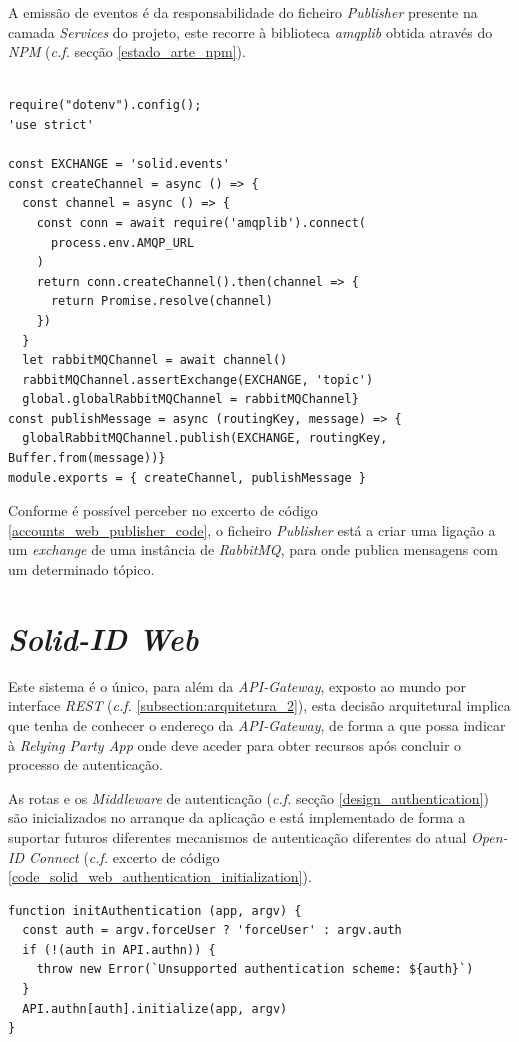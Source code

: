 A emissão de eventos é da responsabilidade do ficheiro \emph{Publisher} presente na camada \emph{Services} do projeto, este recorre à biblioteca \emph{amqplib} obtida através do \emph{NPM} (\emph{c.f.} secção \ref{estado_arte_npm}).

\begin{lstlisting}[caption={\emph{Publisher} responsável por emitir os eventos para o \emph{RabbitMQ}}, label={accounts_web_publisher_code}]

require("dotenv").config();
'use strict'

const EXCHANGE = 'solid.events'
const createChannel = async () => {
  const channel = async () => {
    const conn = await require('amqplib').connect(
      process.env.AMQP_URL
    )
    return conn.createChannel().then(channel => {
      return Promise.resolve(channel)
    })
  }
  let rabbitMQChannel = await channel()
  rabbitMQChannel.assertExchange(EXCHANGE, 'topic')
  global.globalRabbitMQChannel = rabbitMQChannel}
const publishMessage = async (routingKey, message) => {
  globalRabbitMQChannel.publish(EXCHANGE, routingKey, Buffer.from(message))}
module.exports = { createChannel, publishMessage }
\end{lstlisting}

Conforme é possível perceber no excerto de código \ref{accounts_web_publisher_code}, o ficheiro \emph{Publisher} está a criar uma ligação a um \emph{exchange} de uma instância de \emph{RabbitMQ}, para onde publica mensagens com um determinado tópico.

\section{\emph{Solid-ID Web}}
Este sistema é o único, para além da \emph{API-Gateway}, exposto ao mundo por interface \emph{\acrshort{REST}} (\emph{c.f.} \ref{subsection:arquitetura_2}), esta decisão arquitetural implica que tenha de conhecer o endereço da \emph{API-Gateway}, de forma a que possa indicar à \emph{Relying Party App} onde deve aceder para obter recursos após concluir o processo de autenticação.

As rotas e os \emph{Middleware} de autenticação (\emph{c.f.} secção \ref{design_authentication}) são inicializados no arranque da aplicação e está implementado de forma a suportar futuros diferentes mecanismos de autenticação diferentes do atual \emph{Open-ID Connect} (\emph{c.f.} excerto de código \ref{code_solid_web_authentication_initialization}).

\begin{lstlisting}[caption={Inicialização da autenticação no arranque}, label={code_solid_web_authentication_initialization}]
function initAuthentication (app, argv) {
  const auth = argv.forceUser ? 'forceUser' : argv.auth
  if (!(auth in API.authn)) {
    throw new Error(`Unsupported authentication scheme: ${auth}`)
  }
  API.authn[auth].initialize(app, argv)
}
\end{lstlisting}

